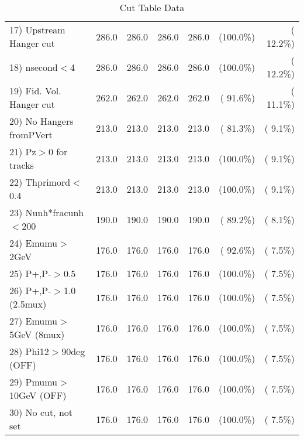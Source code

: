 \begin{table}[h!]
\begin{tabular}{||l||r|r|r|r|r|r||}
 17) Upstream Hanger cut  &        286.0 &        286.0 &        286.0 &        286.0 & (100.0\%) & ( 12.2\%) \\
 18) nsecond$<$4          &        286.0 &        286.0 &        286.0 &        286.0 & (100.0\%) & ( 12.2\%) \\
 19) Fid. Vol. Hanger cut &        262.0 &        262.0 &        262.0 &        262.0 & ( 91.6\%) & ( 11.1\%) \\
 20) No Hangers fromPVert &        213.0 &        213.0 &        213.0 &        213.0 & ( 81.3\%) & (  9.1\%) \\
 21) Pz$>$0 for tracks    &        213.0 &        213.0 &        213.0 &        213.0 & (100.0\%) & (  9.1\%) \\
 22) Thprimord$<$0.4      &        213.0 &        213.0 &        213.0 &        213.0 & (100.0\%) & (  9.1\%) \\
 23) Nunh*fracunh$<$200   &        190.0 &        190.0 &        190.0 &        190.0 & ( 89.2\%) & (  8.1\%) \\
 24) Emumu$>$2GeV         &        176.0 &        176.0 &        176.0 &        176.0 & ( 92.6\%) & (  7.5\%) \\
 25) P+,P-$>$0.5          &        176.0 &        176.0 &        176.0 &        176.0 & (100.0\%) & (  7.5\%) \\
 26) P+,P-$>$1.0 (2.5mux) &        176.0 &        176.0 &        176.0 &        176.0 & (100.0\%) & (  7.5\%) \\
 27) Emumu$>$5GeV  (8mux) &        176.0 &        176.0 &        176.0 &        176.0 & (100.0\%) & (  7.5\%) \\
 28) Phi12$>$90deg  (OFF) &        176.0 &        176.0 &        176.0 &        176.0 & (100.0\%) & (  7.5\%) \\
 29) Pmumu$>$10GeV  (OFF) &        176.0 &        176.0 &        176.0 &        176.0 & (100.0\%) & (  7.5\%) \\
 30) No cut, not set      &        176.0 &        176.0 &        176.0 &        176.0 & (100.0\%) & (  7.5\%) \\
 \hline
 \hline
 \end{tabular}
 \caption{Cut Table  Data     }
 \label{tab-cutcohjpsi-mumu_data}
 \end{table}
